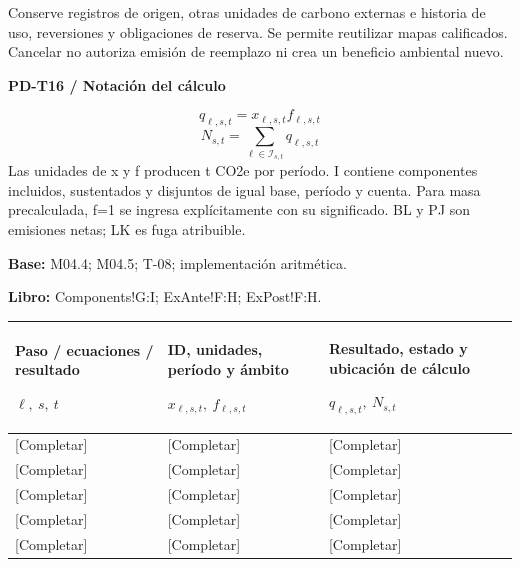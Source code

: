 \begin{Notice}Conserve registros de origen, otras unidades de carbono externas e historia de uso, reversiones y obligaciones de reserva. Se permite reutilizar mapas calificados. Cancelar no autoriza emisión de reemplazo ni crea un beneficio ambiental nuevo.\end{Notice}
\par\begingroup\sffamily\fontsize{8}{10}\selectfont\color{NEBGreen}\setlength{\parskip}{2pt}\setlength{\abovedisplayskip}{4pt}\setlength{\belowdisplayskip}{4pt}\setlength{\abovedisplayshortskip}{2pt}\setlength{\belowdisplayshortskip}{3pt}
\textbf{PD-T16 / Notación del cálculo}\par
{\fontsize{9}{11}\selectfont\[ q_{\ell,s,t}=x_{\ell,s,t}f_{\ell,s,t} \]}
{\fontsize{9}{11}\selectfont\[ N_{s,t}=\sum_{\ell\in\mathcal I_{s,t}}q_{\ell,s,t} \]}
Las unidades de x y f producen t CO2e por período. I contiene componentes incluidos, sustentados y disjuntos de igual base, período y cuenta. Para masa precalculada, f=1 se ingresa explícitamente con su significado. BL y PJ son emisiones netas; LK es fuga atribuible.\par
\textbf{Base:} M04.4; M04.5; T-08; implementación aritmética.\par
\textbf{Libro:} Components!G:I; ExAnte!F:H; ExPost!F:H.\par\endgroup
{\sffamily\fontsize{8.3}{10.3}\selectfont\begin{longtable}{@{}P{52.79mm} P{59.39mm} P{52.79mm}@{}}
\toprule
\textbf{Paso / ecuaciones / resultado}\par {\normalfont\fontsize{8.2}{10}\selectfont $\ell,\ s,\ t$} & \textbf{ID, unidades, período y ámbito}\par {\normalfont\fontsize{8.2}{10}\selectfont $x_{\ell,s,t},\ f_{\ell,s,t}$} & \textbf{Resultado, estado y ubicación de cálculo}\par {\normalfont\fontsize{8.2}{10}\selectfont $q_{\ell,s,t},\ N_{s,t}$}\\\midrule\endhead
\rule{0pt}{7.7mm}[Completar] & [Completar] & [Completar]\\\hline
\rule{0pt}{7.7mm}[Completar] & [Completar] & [Completar]\\\hline
\rule{0pt}{7.7mm}[Completar] & [Completar] & [Completar]\\\hline
\rule{0pt}{7.7mm}[Completar] & [Completar] & [Completar]\\\hline
\rule{0pt}{7.7mm}[Completar] & [Completar] & [Completar]\\\hline
\end{longtable}}
